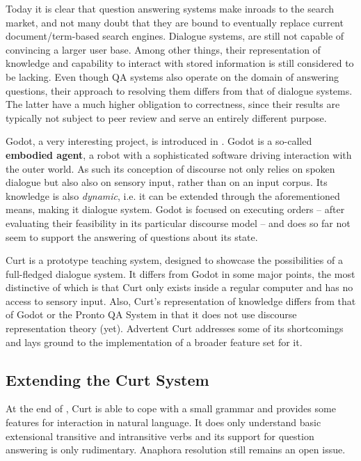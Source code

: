 \documentclass[notitlepage,twoside,a4paper]{scrreprt}
\newcommand{\abbr}{\textsf} %
\newcommand{\term}[1]{\textsf{\textbf{#1}}} %
\newcommand{\pn}{\textsf} %
\newcommand{\curt}{\pn{Curt}}
\newcommand{\acurt}{\pn{Advertent Curt}}
\theoremstyle{remark}
\theoremstyle{remark}
\theoremstyle{definition}
\theoremstyle{definition}
\begin{document}
Today it is clear that question answering systems make inroads to the search
market, and not many doubt that they are bound to eventually replace current
document/term-based search engines. Dialogue systems, are still not capable of
convincing a larger user base. Among other things, their representation of
knowledge and capability to interact with stored information is still considered
to be lacking.  Even though \abbr{QA} systems also operate on the domain of
answering questions, their approach to resolving them differs from that of
dialogue systems. The latter have a much higher obligation to correctness, since
their results are typically not subject to peer review and serve an entirely
different purpose.

\pn{Godot}, a very interesting project, is introduced in \cite{godot}.
\pn{Godot} is a so-called \term{embodied agent}, a robot with a sophisticated
software driving interaction with the outer world. As such its conception of
discourse not only relies on spoken dialogue but also also on sensory input, rather
than on an input corpus. Its knowledge is also \emph{dynamic}, i.e. it can be
extended through the aforementioned means, making it
dialogue system.
\pn{Godot} is focused on executing orders -- after evaluating their feasibility
in its particular discourse model -- and does so far not seem to support the answering
of questions about its state.

\curt{} is a prototype teaching system, designed to showcase the possibilities
of a full-fledged dialogue system. It differs from \pn{Godot} in some major
points, the most distinctive of which is that \curt{} only exists inside a
regular computer and has no access to sensory input. Also, \curt's
representation of knowledge differs from that of \pn{Godot} or the \pn{Pronto QA
System} in that it does not use discourse representation theory (yet). \acurt{}
addresses some of its shortcomings and lays ground to the implementation of a
broader feature set for it.

\subsection{Extending the Curt System}\label{sec:extension}

At the end of \cite{blackburnbos:cl1}, \curt{} is able to cope with a small
grammar and provides some features for interaction in natural
language. It does only understand basic extensional transitive and intransitive
verbs and its support for question answering is only rudimentary.
Anaphora resolution still remains an open issue.
\end{document}
